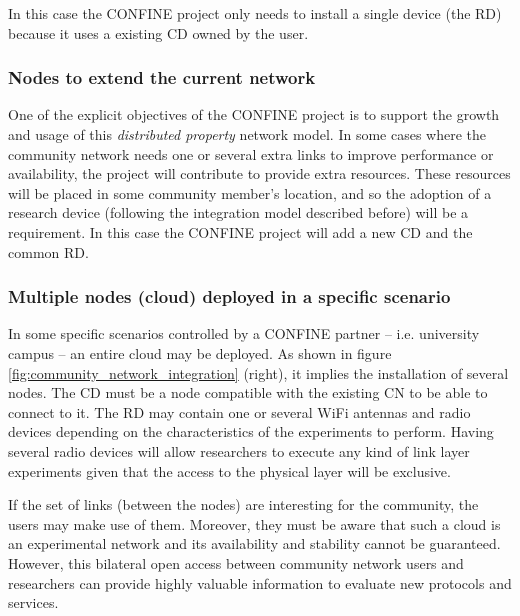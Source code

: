 \documentclass[conference]{IEEEtran}
\begin{document}
In this case the CONFINE project only needs to install a single device (the RD) because it uses a existing
CD owned by the user. 


\subsubsection{Nodes to extend the current network}

One of the explicit objectives of the CONFINE project is to support the growth and usage of this 
\textit{distributed property} network model. In some cases where the community network needs one or 
several extra links to improve performance or availability, the project will
contribute to provide extra resources. These resources will be placed in some community 
member's location, and so the adoption of a research device (following the integration model 
described before) will be a requirement. In this case the CONFINE project will add a new CD and the common RD.

\subsubsection{Multiple nodes (cloud) deployed in a specific scenario}

In some specific scenarios controlled by a CONFINE partner -- i.e. university campus -- an entire cloud may be 
deployed. As shown in figure \ref{fig:community_network_integration} (right), it implies the installation of several 
nodes. The CD must be a node compatible with the existing CN to be able to connect to it. 
The RD may contain one or several WiFi antennas and radio devices depending on the characteristics of the experiments to perform. 
Having several radio devices will allow researchers to execute any kind of link layer experiments given that
the access to the physical layer will be exclusive.

If the set of links (between the nodes) are interesting for the community, the users may make use of them.
Moreover, they must be aware that such a cloud is an experimental network and its availability and stability cannot
be guaranteed. However, this bilateral open access between community network users and researchers can provide
highly valuable information to evaluate new protocols and services.
\end{document}
